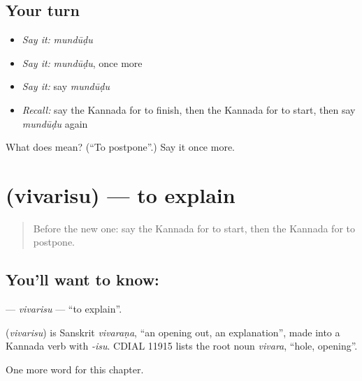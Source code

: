 \subsection*{Your turn}
\begin{itemize}
\raggedright
  \item \emph{Say it:} \emph{mundūḍu}
  \item \emph{Say it:} \emph{mundūḍu}, once more
  \item \emph{Say it:} say \emph{mundūḍu}
  \item \emph{Recall:} say the Kannada for to finish, then the Kannada for to start, then say \emph{mundūḍu} again
\end{itemize}

\begin{tcolorbox}[breakable,colback=teal!4,colframe=teal!35!black,title={Before you move on}]
What does  mean? (\textquotedblleft{}To postpone\textquotedblright{}.) Say it once more.
\end{tcolorbox}
\section[\texorpdfstring{\kn{ವಿವರಿಸು} (vivarisu)}{ವಿವರಿಸು (vivarisu)}]{ (vivarisu) — to explain}

\label{lesson:KA-C201-vivarisu}



\begin{quote}
Before the new one: say the Kannada for to start, then the Kannada for to postpone.
\end{quote}

\subsection*{You'll want to know: }
\textbf{} — \emph{vivarisu} — \textquotedblleft{}to explain\textquotedblright{}.

\begin{cousinweb}
\textbf{} (\emph{vivarisu}) is Sanskrit \emph{vivaraṇa}, \textquotedblleft{}an opening out, an explanation\textquotedblright{}, made into a Kannada verb with \emph{-isu}. CDIAL 11915 lists the root noun \emph{vivara}, \textquotedblleft{}hole, opening\textquotedblright{}.
\end{cousinweb}

\begin{grammarlens}[title={What you've built}]
One more word for this chapter.
\end{grammarlens}

